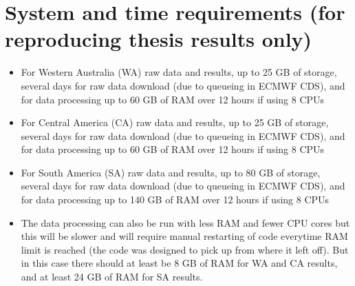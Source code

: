 \section[System and time requirements]{System and time requirements (for reproducing thesis results only)}
\begin{itemize}
	\item For Western Australia (WA) raw data and results, up to 25 GB of storage, several days for raw data download (due to queueing in ECMWF CDS), and for data processing up to 60 GB of RAM over 12 hours if using 8 CPUs
	\item For Central America (CA) raw data and results, up to 25 GB of storage, several days for raw data download (due to queueing in ECMWF CDS), and for data processing up to 60 GB of RAM over 12 hours if using 8 CPUs
	\item For South America (SA) raw data and results, up to 80 GB of storage, several days for raw data download (due to queueing in ECMWF CDS), and for data processing up to 140 GB of RAM over 12 hours if using 8 CPUs
	\item The data processing can also be run with less RAM and fewer CPU cores but this will be slower and will require manual restarting of code everytime RAM limit is reached (the code was designed to pick up from where it left off). But in this case there should at least be 8 GB of RAM for WA and CA results, and at least 24 GB of RAM for SA results.
\end{itemize}
